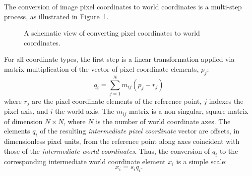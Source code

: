 \documentclass[11pt,makeidx]{book}     %
\begin{document}
The conversion of image pixel coordinates to world coordinates is a multi-step
process, as illustrated in Figure~\ref{fig:px2wld}.  
%
\begin{figure}[t]
\begin{center}
\leavevmode
\epsfysize=9.0cm
\caption{A schematic view of converting pixel coordinates to world coordinates.}
\label{fig:px2wld}
\end{center}
\end{figure}
%

For all coordinate types, the first step is a linear
transformation applied via matrix multiplication of the vector of 
pixel coordinate elements, $p_j$:  
\begin{equation}
q_i = \sum_{j=1}^{N} m_{ij} (p_j - r_j)  \label{eq:pix2intpix}
\end{equation}
where $r_j$ are the pixel coordinate
elements of the reference point, $j$ indexes the pixel axis, and $i$ the world
axis. The $m_{ij}$ matrix is a non-singular, square matrix of dimension 
$N\times N$, where $N$ is the number of world coordinate axes.  
The elements $q_i$ of the resulting
\textit{intermediate pixel coordinate} vector are offsets, in dimensionless pixel
units, from the reference point along axes coincident with those of the
\textit{intermediate world coordinates}. Thus, the conversion of $q_i$ to the
corresponding intermediate world coordinate element $x_i$ is a simple scale:
\begin{equation} 
x_i = s_iq_i.  \label{eq:intpix2intworld} 
\end{equation}
\end{document}
